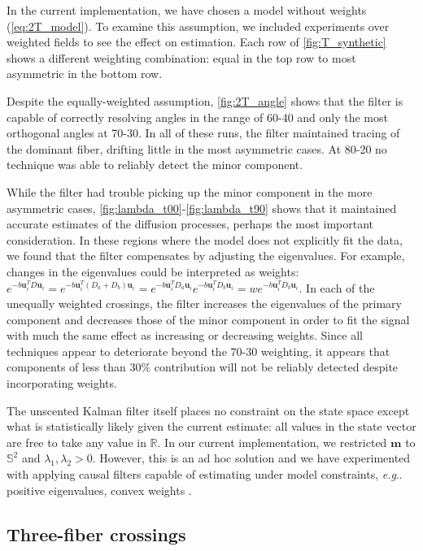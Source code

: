 \documentclass[final,hyperref]{gatech-thesis}
\makeatletter
\renewcommand{\v}[1]{\ensuremath{\mathbf #1}\xspace}
\DeclareRobustCommand\onedot{\futurelet\@let@token\@onedot}
\def\@onedot{\ifx\@let@token.\else.\null\fi\xspace}
\newcommand{\eg}{\textit{e.g}\onedot}
\newcommand{\R}{\ensuremath{\mathbb R}}
\renewcommand{\S}{\ensuremath{\mathbb S}}
\renewcommand{\u}{\v u}
\newcommand{\m}{\v m}
\newcommand{\lx}{{\ensuremath{\lambda_1}} \xspace}
\newcommand{\ly}{{\ensuremath{\lambda_2}} \xspace}
\makeatother
\begin{document}
In the current implementation, we have chosen a model without weights
(\autoref{eq:2T_model}).  To examine this assumption, we included experiments
over weighted fields to see the effect on estimation.
%
Each row of \autoref{fig:T_synthetic} shows a different weighting combination:
equal in the top row to most asymmetric in the bottom row.

Despite the equally-weighted assumption, \autoref{fig:2T_angle} shows that the
filter is capable of correctly resolving angles in the range of 60-40 and only
the most orthogonal angles at 70-30.  In all of these runs, the filter
maintained tracing of the dominant fiber, drifting little in the most
asymmetric cases.  At 80-20 no technique was able to reliably detect the minor
component.

While the filter had trouble picking up the minor component in the more
asymmetric cases, \autoref{fig:lambda_t00}-\ref{fig:lambda_t90} shows that it
maintained accurate estimates of the diffusion processes, perhaps the most
important consideration.
%
In these regions where the model does not explicitly fit the data, we found
that the filter compensates by adjusting the eigenvalues.  For example,
changes in the eigenvalues could be interpreted as weights:
%
$
 e^{ -b \u_i^T D \u_i }
   = e^{ -b \u_i^T (D_a + D_b) \u_i }
   = e^{ -b \u_i^T D_a \u_i } e^{ -b \u_i^T D_b \u_i }
   = w e^{ -b \u_i^T D_b \u_i } .
$
%
In each of the unequally weighted crossings, the filter increases the
eigenvalues of the primary component and decreases those of the minor
component in order to fit the signal with much the same effect as increasing
or decreasing weights.  Since all techniques appear to deteriorate beyond the
70-30 weighting, it appears that components of less than 30\% contribution
will not be reliably detected despite incorporating weights.

The unscented Kalman filter itself places no constraint on the state space
except what is statistically likely given the current estimate:  all values in
the state vector are free to take any value in \R.  In our current
implementation, we restricted $\m$ to $\S^2$ and $\lx,\ly > 0$.  However, this
is an ad hoc solution and we have experimented with applying causal filters
capable of estimating under model constraints, \eg positive eigenvalues,
convex weights \cite{malcolm2009cukf}.




\subsection{Three-fiber crossings} \label{sec:3T}
\end{document}
